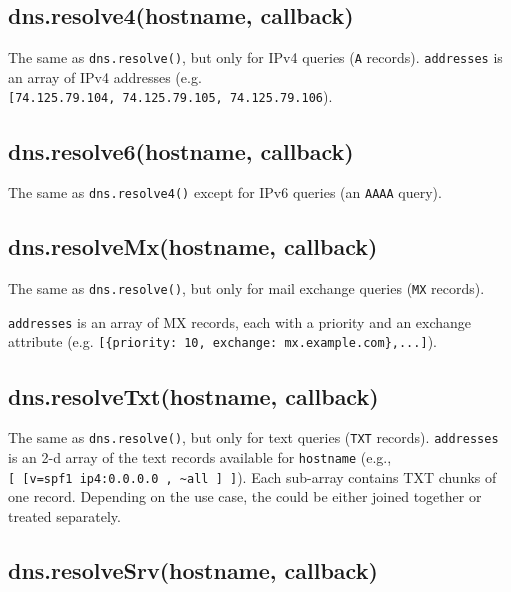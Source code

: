 \subsection{dns.resolve4(hostname,
callback)}\label{dns.resolve4hostname-callback}

The same as \texttt{dns.resolve()}, but only for IPv4 queries
(\texttt{A} records). \texttt{addresses} is an array of IPv4 addresses
(e.g.
\texttt{{[}\textquotesingle{}74.125.79.104\textquotesingle{},\ \textquotesingle{}74.125.79.105\textquotesingle{},\ \textquotesingle{}74.125.79.106\textquotesingle{}{]}}).

\subsection{dns.resolve6(hostname,
callback)}\label{dns.resolve6hostname-callback}

The same as \texttt{dns.resolve4()} except for IPv6 queries (an
\texttt{AAAA} query).

\subsection{dns.resolveMx(hostname,
callback)}\label{dns.resolvemxhostname-callback}

The same as \texttt{dns.resolve()}, but only for mail exchange queries
(\texttt{MX} records).

\texttt{addresses} is an array of MX records, each with a priority and
an exchange attribute (e.g.
\texttt{{[}\{\textquotesingle{}priority\textquotesingle{}:\ 10,\ \textquotesingle{}exchange\textquotesingle{}:\ \textquotesingle{}mx.example.com\textquotesingle{}\},...{]}}).

\subsection{dns.resolveTxt(hostname,
callback)}\label{dns.resolvetxthostname-callback}

The same as \texttt{dns.resolve()}, but only for text queries
(\texttt{TXT} records). \texttt{addresses} is an 2-d array of the text
records available for \texttt{hostname} (e.g.,
\texttt{{[}\ {[}\textquotesingle{}v=spf1\ ip4:0.0.0.0\ \textquotesingle{},\ \textquotesingle{}\textasciitilde{}all\textquotesingle{}\ {]}\ {]}}).
Each sub-array contains TXT chunks of one record. Depending on the use
case, the could be either joined together or treated separately.

\subsection{dns.resolveSrv(hostname,
callback)}\label{dns.resolvesrvhostname-callback}

